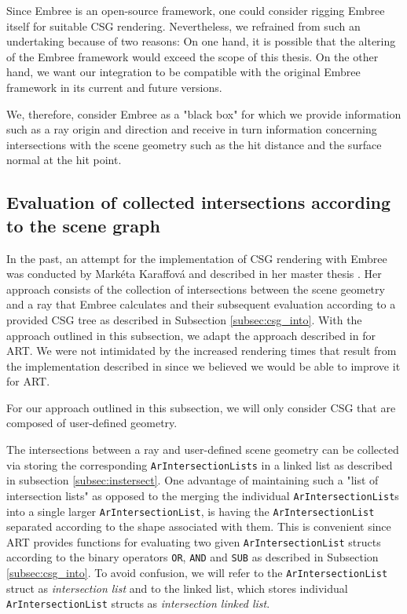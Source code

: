Since Embree is an open-source framework, one could consider rigging Embree itself for suitable CSG rendering. Nevertheless, we refrained from such an undertaking because of two reasons: On one hand, it is possible that the altering of the Embree framework would exceed the scope of this thesis. On the other hand, we want our integration to be compatible with the original Embree framework in its current and future versions.

We, therefore, consider Embree as a "black box" for which we provide information such as a ray origin and direction and receive in turn information concerning intersections with the scene geometry such as the hit distance and the surface normal at the hit point.


\subsection{Evaluation of collected intersections according to the scene graph}
\label{subsec:apprach1}

In the past, an attempt for the implementation of CSG rendering with Embree was conducted by Markéta Karaffová and described in her master thesis \cite{karaffova2016}. Her approach consists of the collection of intersections between the scene geometry and a ray that Embree calculates and their subsequent evaluation according to a provided CSG tree as described in Subsection \ref{subsec:csg_into}.
With the approach outlined in this subsection, we adapt the approach described in \cite{karaffova2016} for ART. We were not intimidated by the increased rendering times that result from the implementation described in \cite{karaffova2016} since we believed we would be able to improve it for ART.

For our approach outlined in this subsection, we will only consider CSG that are composed of user-defined geometry.

The intersections between a ray and user-defined scene geometry can be collected via storing the corresponding \texttt{ArIntersectionLists} in a linked list as described in subsection \ref{subsec:instersect}. One advantage of maintaining such a "list of intersection lists" as opposed to the merging the individual \texttt{ArIntersectionList}s into a single larger \texttt{ArIntersectionList}, is having the \texttt{ArIntersectionList} separated according to the shape associated with them. This is convenient since ART provides functions for evaluating two given \texttt{ArIntersectionList} structs according to the binary operators \texttt{OR}, \texttt{AND} and \texttt{SUB} as described in Subsection \ref{subsec:csg_into}. To avoid confusion, we will refer to the \texttt{ArIntersectionList} struct as \emph{intersection list} and to the linked list, which stores individual \texttt{ArIntersectionList} structs as \emph{intersection linked list}.


